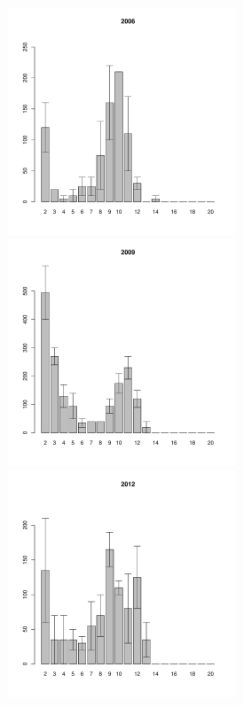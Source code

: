 	\begin{figure}[hp]

	\begin{minipage}[b]{.3\linewidth}
	\begin{center}
	\includegraphics[width=60mm]{../White_Sea/Ryashkov_ZRS/zrs2_2006_.pdf}
	\end{center}
	\end{minipage}
	\hfill
	\begin{minipage}[b]{.3\linewidth}
	\begin{center}
	\includegraphics[width=60mm]{../White_Sea/Ryashkov_ZRS/zrs2_2009_.pdf}
	\end{center}
	\end{minipage}
	\hfill
	\begin{minipage}[b]{.3\linewidth}
	\begin{center}
	\includegraphics[width=60mm]{../White_Sea/Ryashkov_ZRS/zrs2_2012_.pdf}

\end{center}
\end{minipage}
\end{figure}
